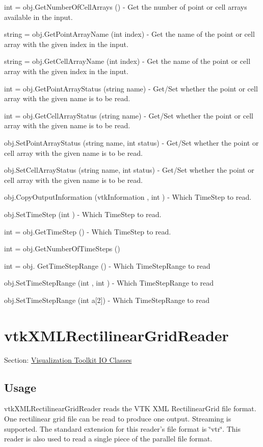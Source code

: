\begin{DoxyItemize}
\item {\ttfamily int = obj.\-Get\-Number\-Of\-Cell\-Arrays ()} -\/ Get the number of point or cell arrays available in the input.  
\item {\ttfamily string = obj.\-Get\-Point\-Array\-Name (int index)} -\/ Get the name of the point or cell array with the given index in the input.  
\item {\ttfamily string = obj.\-Get\-Cell\-Array\-Name (int index)} -\/ Get the name of the point or cell array with the given index in the input.  
\item {\ttfamily int = obj.\-Get\-Point\-Array\-Status (string name)} -\/ Get/\-Set whether the point or cell array with the given name is to be read.  
\item {\ttfamily int = obj.\-Get\-Cell\-Array\-Status (string name)} -\/ Get/\-Set whether the point or cell array with the given name is to be read.  
\item {\ttfamily obj.\-Set\-Point\-Array\-Status (string name, int status)} -\/ Get/\-Set whether the point or cell array with the given name is to be read.  
\item {\ttfamily obj.\-Set\-Cell\-Array\-Status (string name, int status)} -\/ Get/\-Set whether the point or cell array with the given name is to be read.  
\item {\ttfamily obj.\-Copy\-Output\-Information (vtk\-Information , int )} -\/ Which Time\-Step to read.  
\item {\ttfamily obj.\-Set\-Time\-Step (int )} -\/ Which Time\-Step to read.  
\item {\ttfamily int = obj.\-Get\-Time\-Step ()} -\/ Which Time\-Step to read.  
\item {\ttfamily int = obj.\-Get\-Number\-Of\-Time\-Steps ()}  
\item {\ttfamily int = obj. Get\-Time\-Step\-Range ()} -\/ Which Time\-Step\-Range to read  
\item {\ttfamily obj.\-Set\-Time\-Step\-Range (int , int )} -\/ Which Time\-Step\-Range to read  
\item {\ttfamily obj.\-Set\-Time\-Step\-Range (int a\mbox{[}2\mbox{]})} -\/ Which Time\-Step\-Range to read  
\end{DoxyItemize}\hypertarget{vtkio_vtkxmlrectilineargridreader}{}\section{vtk\-X\-M\-L\-Rectilinear\-Grid\-Reader}\label{vtkio_vtkxmlrectilineargridreader}
Section\-: \hyperlink{sec_vtkio}{Visualization Toolkit I\-O Classes} \hypertarget{vtkwidgets_vtkxyplotwidget_Usage}{}\subsection{Usage}\label{vtkwidgets_vtkxyplotwidget_Usage}
vtk\-X\-M\-L\-Rectilinear\-Grid\-Reader reads the V\-T\-K X\-M\-L Rectilinear\-Grid file format. One rectilinear grid file can be read to produce one output. Streaming is supported. The standard extension for this reader's file format is \char`\"{}vtr\char`\"{}. This reader is also used to read a single piece of the parallel file format.

